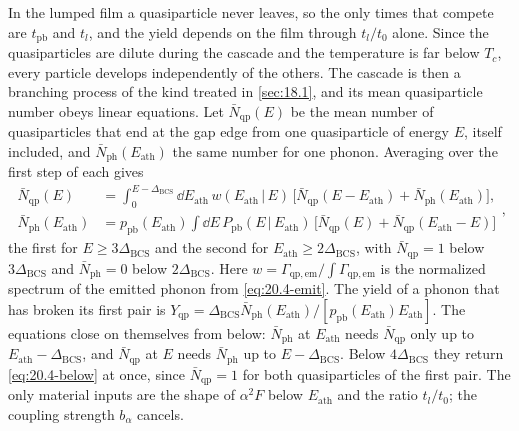 In the lumped film a quasiparticle never leaves, so the only times that compete are $t_{\mathrm{pb}}$ and $t_l$, and the yield depends on the film through $t_l/t_0$ alone. Since the quasiparticles are dilute during the cascade and the temperature is far below $T_c$, every particle develops independently of the others. The cascade is then a branching process of the kind treated in \cref{sec:18.1}, and its mean quasiparticle number obeys linear equations. Let $\bar N_{\mathrm{qp}}(E)$ be the mean number of quasiparticles that end at the gap edge from one quasiparticle of energy $E$, itself included, and $\bar N_{\mathrm{ph}}(E_{\mathrm{ath}})$ the same number for one phonon. Averaging over the first step of each gives
\begin{equation}
  \begin{aligned}
  \bar N_{\mathrm{qp}}(E) &= \int_0^{E - \Delta_{\mathrm{BCS}}}\dd E_{\mathrm{ath}}\,w(E_{\mathrm{ath}}\,|\,E)\,\bigl[\bar N_{\mathrm{qp}}(E - E_{\mathrm{ath}}) + \bar N_{\mathrm{ph}}(E_{\mathrm{ath}})\bigr] ,\\
  \bar N_{\mathrm{ph}}(E_{\mathrm{ath}}) &= p_{\mathrm{pb}}(E_{\mathrm{ath}})\int\dd E\,P_{\mathrm{pb}}(E\,|\,E_{\mathrm{ath}})\,\bigl[\bar N_{\mathrm{qp}}(E) + \bar N_{\mathrm{qp}}(E_{\mathrm{ath}} - E)\bigr]
  \end{aligned} ,
  \label{eq:20.4-cascade}
\end{equation}
the first for $E \ge 3\Delta_{\mathrm{BCS}}$ and the second for $E_{\mathrm{ath}} \ge 2\Delta_{\mathrm{BCS}}$, with $\bar N_{\mathrm{qp}} = 1$ below $3\Delta_{\mathrm{BCS}}$ and $\bar N_{\mathrm{ph}} = 0$ below $2\Delta_{\mathrm{BCS}}$. Here $w = \varGamma_{\mathrm{qp,em}}/\int\varGamma_{\mathrm{qp,em}}$ is the normalized spectrum of the emitted phonon from \cref{eq:20.4-emit}. The yield of a phonon that has broken its first pair is $Y_{\mathrm{qp}} = \Delta_{\mathrm{BCS}}\bar N_{\mathrm{ph}}(E_{\mathrm{ath}})/[p_{\mathrm{pb}}(E_{\mathrm{ath}})E_{\mathrm{ath}}]$. The equations close on themselves from below: $\bar N_{\mathrm{ph}}$ at $E_{\mathrm{ath}}$ needs $\bar N_{\mathrm{qp}}$ only up to $E_{\mathrm{ath}} - \Delta_{\mathrm{BCS}}$, and $\bar N_{\mathrm{qp}}$ at $E$ needs $\bar N_{\mathrm{ph}}$ up to $E - \Delta_{\mathrm{BCS}}$. Below $4\Delta_{\mathrm{BCS}}$ they return \cref{eq:20.4-below} at once, since $\bar N_{\mathrm{qp}} = 1$ for both quasiparticles of the first pair. The only material inputs are the shape of $\alpha^2F$ below $E_{\mathrm{ath}}$ and the ratio $t_l/t_0$; the coupling strength $b_\alpha$ cancels.

